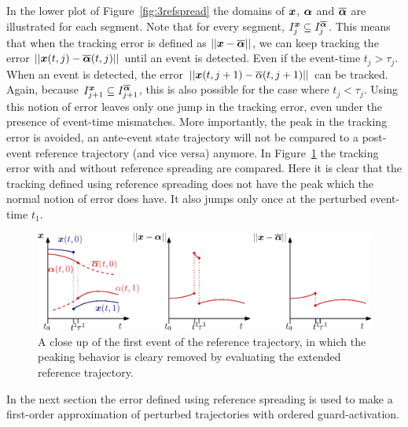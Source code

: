 \documentclass[../DC2017114Bouma.tex]{subfiles}
\begin{document}
In the lower plot of Figure~\ref{fig:3refspread} the domains of ${\boldsymbol{x}}$, $\boldsymbol{\alpha}$ and $\overline{\boldsymbol{\alpha}}$ are illustrated for each segment. Note that for every segment, $I^{{\boldsymbol{x}}}_j\subseteq I^{\overline{\boldsymbol{\alpha}}}_j$. This means that when the tracking error is defined as $||{\boldsymbol{x}}-\overline{\boldsymbol{\alpha}}||$, we can keep tracking the error $||{\boldsymbol{x}}(t,j)-\overline{\boldsymbol{\alpha}}(t,j)||$ until an event is detected. Even if the event-time $t_j>\tau_j$. When an event is detected, the error  $||{\boldsymbol{x}}(t,j+1)-\overline{\alpha}(t,j+1)||$ can be tracked. Again, because $I^{{\boldsymbol{x}}}_{j+1}\subseteq I^{\overline{\boldsymbol{\alpha}}}_{j+1}$, this is also possible for the case where $t_j<\tau_j$. Using this notion of error leaves only one jump in the tracking error, even under the presence of event-time mismatches. More importantly, the peak in the tracking error is avoided, an ante-event state trajectory will not be compared to a post-event reference trajectory (and vice versa) anymore. In Figure~\ref{fig:3refspreaderrors} the tracking error with and without reference spreading are compared. Here it is clear that the tracking defined using reference spreading does not have the peak which the normal notion of error does have. It also jumps only once at the perturbed event-time $t_1$.
\begin{figure}[h]
\centering
\includegraphics[width=\textwidth]{refspreaderrors.eps}\caption{A close up of the  first event of the reference trajectory, in which the peaking behavior is cleary removed by evaluating the extended reference trajectory.} \label{fig:3refspreaderrors}
\end{figure}

In the next section the error defined using reference spreading is used to make a first-order approximation of perturbed trajectories with ordered guard-activation.
\end{document}
